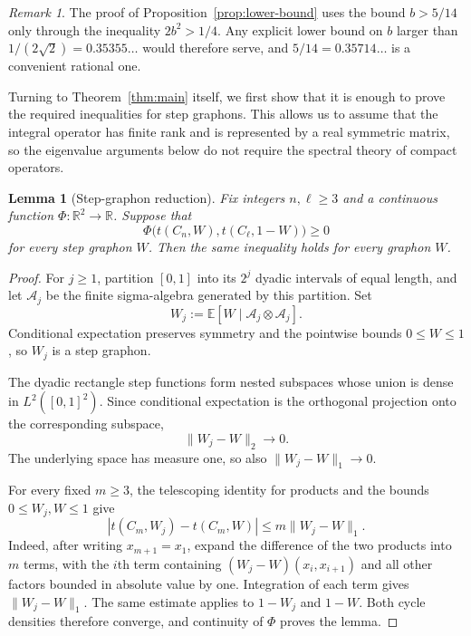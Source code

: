 \documentclass[11pt]{article}
\newtheorem{lemma}[theorem]{Lemma}
\theoremstyle{definition}
\theoremstyle{remark}
\newtheorem{remark}[theorem]{Remark}
\newcommand{\R}{\mathbb{R}}
\begin{document}
\begin{remark}
  The proof of Proposition~\ref{prop:lower-bound} uses the bound $b>5/14$
  only through the inequality $2b^2>1/4$.  Any explicit lower bound on $b$
  larger than $1/(2\sqrt2)=0.35355\ldots$ would therefore serve, and
  $5/14=0.35714\ldots$ is a convenient rational one.
\end{remark}

Turning to Theorem~\ref{thm:main} itself, we first show that it is enough to
prove the required inequalities for step graphons.  This allows us to assume
that the integral operator has finite rank and is represented by a real
symmetric matrix, so the eigenvalue arguments below do not require the
spectral theory of compact operators.

\begin{lemma}[Step-graphon reduction]
  \label{lem:step-reduction}
  Fix integers $n,\ell\ge3$ and a continuous function
  $\Phi\colon\R^2\to\R$.  Suppose that
  \[
    \Phi\bigl(t(C_n,W),t(C_\ell,1-W)\bigr)\ge0
  \]
  for every step graphon $W$.  Then the same inequality holds for
  every graphon $W$.
\end{lemma}

\begin{proof}
  For $j\ge1$, partition $[0,1]$ into its $2^j$ dyadic intervals of equal
  length, and let $\mathcal A_j$ be the finite sigma-algebra generated by this
  partition.  Set
  \[
    W_j:=\mathbb E[W\mid\mathcal A_j\otimes\mathcal A_j].
  \]
  Conditional expectation preserves symmetry and the pointwise bounds
  $0\le W\le1$, so $W_j$ is a step graphon.

  The dyadic rectangle step functions form nested subspaces whose union is
  dense in $L^2([0,1]^2)$.  Since conditional expectation is the orthogonal
  projection onto the corresponding subspace,
  \[
    \|W_j-W\|_2\longrightarrow0.
  \]
  The underlying space has measure one, so also
  $\|W_j-W\|_1\to0$.

  For every fixed $m\ge3$, the telescoping identity for products and the
  bounds $0\le W_j,W\le1$ give
  \[
    |t(C_m,W_j)-t(C_m,W)|
    \le m\|W_j-W\|_1.
  \]
  Indeed, after writing $x_{m+1}=x_1$, expand the difference of the two
  products into $m$ terms, with the $i$th term containing
  $(W_j-W)(x_i,x_{i+1})$ and all other factors bounded in absolute value by
  one.  Integration of each term gives $\|W_j-W\|_1$.  The same estimate
  applies to $1-W_j$ and $1-W$.  Both cycle densities therefore converge,
  and continuity of $\Phi$ proves the lemma.
\end{proof}
\end{document}

